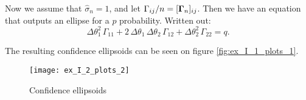 Now we assume that $\hat{\sigma}_n=1$, and let $\Gamma_{ij}/n = [\boldsymbol{\mathrm{\Gamma}}_n]_{ij}$. Then we have an equation that outputs an ellipse for a $p$ probability.
Written out:
\begin{equation}
	\Delta\theta_1^2\,\Gamma_{11} + 2\,\Delta\theta_1\,\Delta\theta_2\,\Gamma_{12} + \Delta\theta_2^2\,\Gamma_{22} = q.
\end{equation}

The resulting confidence ellipsoids can be seen on figure \ref{fig:ex_I_1_plots_1}.

\begin{figure}[H]
	\centering
	\texttt{[image: ex\_I\_2\_plots\_2]}
	\caption{Confidence ellipsoids}
	\label{fig:ex_I_2_plots_2}
\end{figure}

